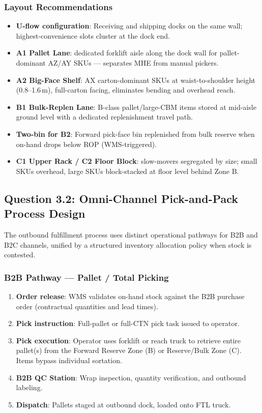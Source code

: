 \documentclass[11pt]{article}
\begin{document}
\subsubsection{Layout Recommendations}\label{layout}
\begin{itemize}
    \item \textbf{U-flow configuration}: Receiving and shipping docks on the same wall;
          highest-convenience slots cluster at the dock end.
    \item \textbf{A1 Pallet Lane}: dedicated forklift aisle along the dock wall for
          pallet-dominant AZ/AY SKUs --- separates MHE from manual pickers.
    \item \textbf{A2 Big-Face Shelf}: AX carton-dominant SKUs at waist-to-shoulder height
          (0.8--1.6\,m), full-carton facing, eliminates bending and overhead reach.
    \item \textbf{B1 Bulk-Replen Lane}: B-class pallet/large-CBM items stored at
          mid-aisle ground level with a dedicated replenishment travel path.
    \item \textbf{Two-bin for B2}: Forward pick-face bin replenished from bulk
          reserve when on-hand drops below ROP (WMS-triggered).
    \item \textbf{C1 Upper Rack / C2 Floor Block}: slow-movers segregated by size;
          small SKUs overhead, large SKUs block-stacked at floor level behind Zone B.
\end{itemize}

\subsection{Question 3.2: Omni-Channel Pick-and-Pack Process Design}\label{q3.2}

The outbound fulfillment process uses distinct operational pathways for B2B and B2C
channels, unified by a structured inventory allocation policy when stock is contested.

\subsubsection{B2B Pathway — Pallet / Total Picking}\label{b2b-path}
\begin{enumerate}
    \item \textbf{Order release}: WMS validates on-hand stock against the B2B
          purchase order (contractual quantities and lead times).
    \item \textbf{Pick instruction}: Full-pallet or full-CTN pick task issued to operator.
    \item \textbf{Pick execution}: Operator uses forklift or reach truck to retrieve
          entire pallet(s) from the Forward Reserve Zone (B) or Reserve/Bulk Zone (C).
          Items bypass individual sortation.
    \item \textbf{B2B QC Station}: Wrap inspection, quantity verification, and
          outbound labeling.
    \item \textbf{Dispatch}: Pallets staged at outbound dock, loaded onto FTL truck.
\end{enumerate}
\end{document}
